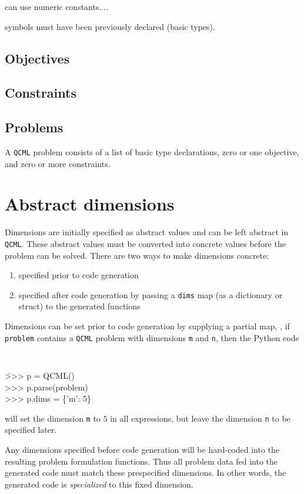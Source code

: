 \documentclass[11pt]{article}
\def\qcml{\texttt{QCML}\xspace}
\begin{document}
can use numeric constants....

symbols must have been previously declared (basic types).

\subsection{Objectives}
\subsection{Constraints}
\subsection{Problems}
A \qcml problem consists of a list of basic type declarations, zero or one
objective, and zero or more constraints. 


\section{Abstract dimensions}
\label{s-abstract-dims}
Dimensions are initially specified as abstract values and can be left abstract
in \qcml. These abstract values must be converted into concrete values
before the problem can be solved. There are two ways to make dimensions 
concrete:
\begin{enumerate}
\item specified prior to code generation
\item specified after code generation by passing a {\tt dims} map (as a
  dictionary or struct) to the generated functions %
\end{enumerate}

Dimensions can be set prior to code generation by supplying
a partial map, \ie, if {\tt problem} contains a \qcml problem with 
dimensions \texttt{m} and \texttt{n}, then the Python code
{\tt
\begin{tabbing}
  \qquad \= >>> p = QCML() \\
  \> >>> p.parse(problem) \\
  \> >>> p.dims = \{'m': 5\}
\end{tabbing}
}
\noindent will set the dimension {\tt m} to $5$ in all expressions, but leave 
the dimension {\tt n} to be specified later.

Any dimensions specified before code generation will be hard-coded into the
resulting problem formulation functions. Thus all problem data fed into the
generated code must match these prespecified dimensions. In other words, the
generated code is \emph{specialized} to this fixed dimension.
\end{document}
